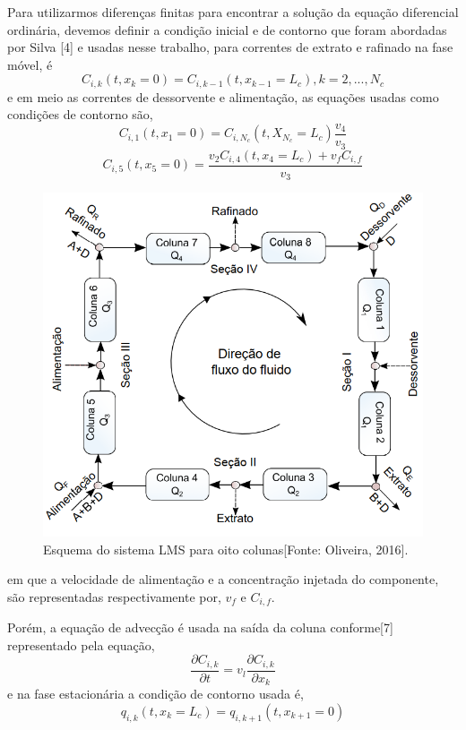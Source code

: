 \documentclass[por]{Template_SBEF}
\begin{document}
Para utilizarmos diferenças finitas para encontrar a solução da equação diferencial ordinária, devemos definir a condição inicial e de contorno que foram abordadas por Silva [4] e usadas nesse trabalho, para correntes de extrato e rafinado na fase móvel, é
\begin{equation}
C_{i,k}(t,x_k = 0) = C_{i,k-1}(t, x_{k-1} = L_c), k = 2, ... , N_c
\end{equation}
e em meio as correntes de dessorvente e alimentação, as equações usadas como condições de contorno são,
\begin{equation}
C_{i,1}(t,x_1 = 0) = C_{i,N_c}(t,X_{N_c} = L_c) \frac{v_4}{v_3}
\end{equation}
\begin{equation}
C_{i,5}(t,x_5 = 0) = \frac{v_2 C_{i,4}(t,x_4 = L_c) + v_fC_{i,f}}{v_3} 
\end{equation}

\begin{figure}[H] 
 \centering
  \includegraphics[width=.8\columnwidth]{Arquivos/figura1.png} 
 \caption{Esquema do sistema LMS para oito colunas[Fonte: Oliveira, 2016].} \label{fig-1}
\end{figure}

em que a velocidade de alimentação e a concentração injetada do componente, são representadas respectivamente por, $v_f$ e $C_{i,f}$.

Porém, a equação de advecção é usada na saída da coluna conforme[7] representado pela equação,
\begin{equation}
\frac{\partial C_{i,k}}{\partial t} = v_l \frac{\partial C_{i,k}}{\partial x_k}
\end{equation}
 e na fase estacionária a condição de contorno usada é,
 \begin{equation}
 q_{i,k}(t,x_k = L_c) = q_{i,k+1}(t, x_{k+1} = 0)
 \end{equation}
\end{document}
